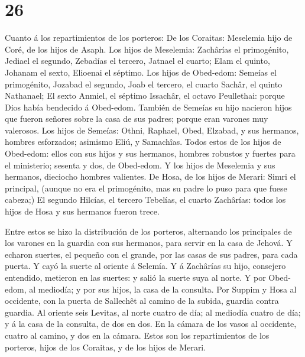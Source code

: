 \hypertarget{section-25}{%
\section{26}\label{section-25}}

 Cuanto á los repartimientos de los porteros: De los
Coraitas: Meselemia hijo de Coré, de los hijos de Asaph. 
Los hijos de Meselemia: Zachârías el primogénito, Jediael el segundo,
Zebadías el tercero, Jatnael el cuarto;  Elam el quinto,
Johanam el sexto, Elioenai el séptimo.  Los hijos de
Obed-edom: Semeías el primogénito, Jozabad el segundo, Joab el tercero,
el cuarto Sachâr, el quinto Nathanael;  El sexto Anmiel, el
séptimo Issachâr, el octavo Peullethai: porque Dios había bendecido á
Obed-edom.  También de Semeías su hijo nacieron hijos que
fueron señores sobre la casa de sus padres; porque eran varones muy
valerosos.  Los hijos de Semeías: Othni, Raphael, Obed,
Elzabad, y sus hermanos, hombres esforzados; asimismo Eliú, y Samachîas.
 Todos estos de los hijos de Obed-edom: ellos con sus hijos
y sus hermanos, hombres robustos y fuertes para el ministerio; sesenta y
dos, de Obed-edom.  Y los hijos de Meselemia y sus hermanos,
dieciocho hombres valientes.  De Hosa, de los hijos de
Merari: Simri el principal, (aunque no era el primogénito, mas su padre
lo puso para que fuese cabeza;)  El segundo Hilcías, el
tercero Tebelías, el cuarto Zachârías: todos los hijos de Hosa y sus
hermanos fueron trece.

 Entre estos se hizo la distribución de los porteros,
alternando los principales de los varones en la guardia con sus
hermanos, para servir en la casa de Jehová.  Y echaron
suertes, el pequeño con el grande, por las casas de sus padres, para
cada puerta.  Y cayó la suerte al oriente á Selemía. Y á
Zachârías su hijo, consejero entendido, metieron en las suertes: y salió
la suerte suya al norte.  Y por Obed-edom, al mediodía; y
por sus hijos, la casa de la consulta.  Por Suppim y Hosa
al occidente, con la puerta de Sallechêt al camino de la subida, guardia
contra guardia.  Al oriente seis Levitas, al norte cuatro
de día; al mediodía cuatro de día; y á la casa de la consulta, de dos en
dos.  En la cámara de los vasos al occidente, cuatro al
camino, y dos en la cámara.  Estos son los repartimientos
de los porteros, hijos de los Coraitas, y de los hijos de Merari.

